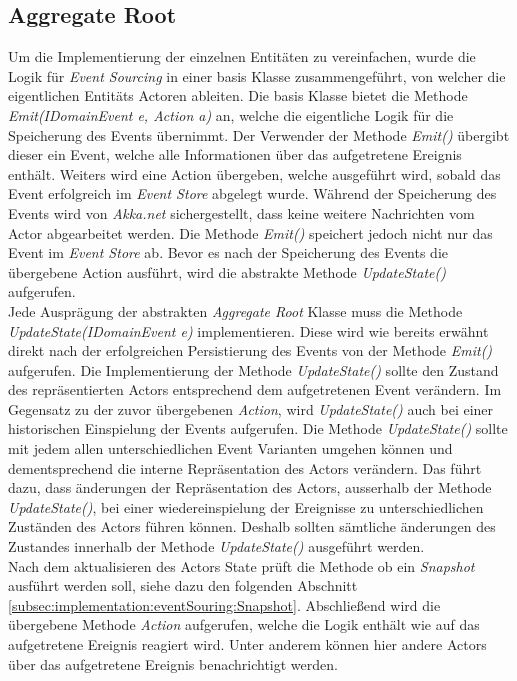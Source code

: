 \subsection{Aggregate Root}
Um die Implementierung der einzelnen Entitäten zu vereinfachen, wurde die Logik für \textit{Event Sourcing} in einer basis Klasse zusammengeführt, von welcher die eigentlichen Entitäts Actoren ableiten. 
Die basis Klasse bietet die Methode \textit{Emit(IDomainEvent e, Action a)} an, welche die eigentliche Logik für die Speicherung des Events übernimmt. Der Verwender der Methode \textit{Emit()} übergibt dieser ein Event, welche alle Informationen über das aufgetretene Ereignis enthält. Weiters wird eine Action übergeben, welche ausgeführt wird, sobald das Event erfolgreich im \textit{Event Store} abgelegt wurde. Während der Speicherung des Events wird von \textit{Akka.net} sichergestellt, dass keine weitere Nachrichten vom Actor abgearbeitet werden. Die Methode \textit{Emit()} speichert jedoch nicht nur das Event im \textit{Event Store} ab. Bevor es nach der Speicherung des Events die übergebene Action ausführt, wird die abstrakte Methode \textit{UpdateState()} aufgerufen. \\
Jede Ausprägung der abstrakten \textit{Aggregate Root} Klasse muss die Methode \textit{UpdateState(IDomainEvent e)} implementieren. Diese wird wie bereits erwähnt direkt nach der erfolgreichen Persistierung des Events von der Methode \textit{Emit()} aufgerufen. Die Implementierung der Methode \textit{UpdateState()} sollte den Zustand des repräsentierten Actors entsprechend dem aufgetretenen Event verändern. Im Gegensatz zu der zuvor übergebenen \textit{Action}, wird \textit{UpdateState()} auch bei einer historischen Einspielung der Events aufgerufen. Die Methode \textit{UpdateState()} sollte mit jedem allen unterschiedlichen Event Varianten umgehen können und dementsprechend die interne Repräsentation des Actors verändern. Das führt dazu, dass änderungen der Repräsentation des Actors, ausserhalb der Methode \textit{UpdateState()}, bei einer wiedereinspielung der Ereignisse zu unterschiedlichen Zuständen des Actors führen können. Deshalb sollten sämtliche änderungen des Zustandes innerhalb der Methode \textit{UpdateState()} ausgeführt werden. \\
Nach dem aktualisieren des Actors State prüft die Methode ob ein \textit{Snapshot} ausführt werden soll, siehe dazu den folgenden Abschnitt \ref{subsec:implementation:eventSouring:Snapshot}. Abschließend wird die übergebene Methode \textit{Action} aufgerufen, welche die Logik enthält wie auf das aufgetretene Ereignis reagiert wird. Unter anderem können hier andere Actors über das aufgetretene Ereignis benachrichtigt werden. 

